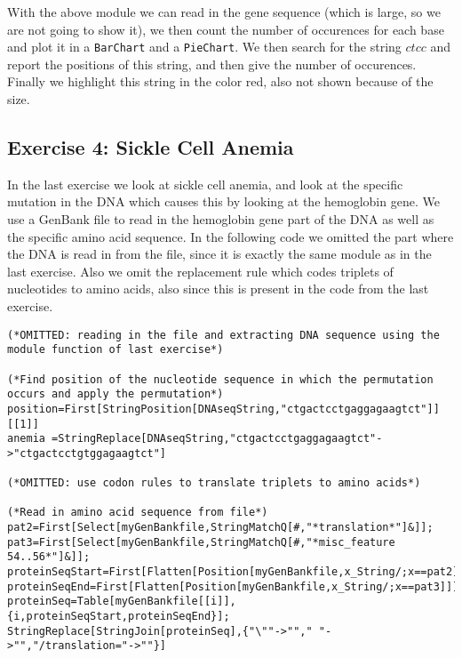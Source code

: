 \documentclass[11pt,a4paper,onecolumn]{article}
\begin{document}
\begin{figure}[H]
  \centering
\end{figure}

With the above module we can read in the gene sequence (which is large, so we are not going to show it), we then count the number of occurences for each base and plot it in a \texttt{BarChart} and a \texttt{PieChart}. We then search for the string $ctcc$ and report the positions of this string, and then give the number of occurences. Finally we highlight this string in the color red, also not shown because of the size.

\subsection{Exercise 4: Sickle Cell Anemia}
In the last exercise we look at sickle cell anemia, and look at the specific mutation in the DNA which causes this by looking at the hemoglobin gene. We use a GenBank file to read in the hemoglobin gene part of the DNA as well as the specific amino acid sequence. In the following code we omitted the part where the DNA is read in from the file, since it is exactly the same module as in the last exercise. Also we omit the replacement rule which codes triplets of nucleotides to amino acids, also since this is present in the code from the last exercise.

\begin{lstlisting}[mathescape]
(*OMITTED: reading in the file and extracting DNA sequence using the module function of last exercise*)

(*Find position of the nucleotide sequence in which the permutation occurs and apply the permutation*)
position=First[StringPosition[DNAseqString,"ctgactcctgaggagaagtct"]][[1]]
anemia =StringReplace[DNAseqString,"ctgactcctgaggagaagtct"->"ctgactcctgtggagaagtct"]

(*OMITTED: use codon rules to translate triplets to amino acids*)

(*Read in amino acid sequence from file*)
pat2=First[Select[myGenBankfile,StringMatchQ[#,"*translation*"]&]];
pat3=First[Select[myGenBankfile,StringMatchQ[#,"*misc_feature    54..56*"]&]];
proteinSeqStart=First[Flatten[Position[myGenBankfile,x_String/;x==pat2]]];
proteinSeqEnd=First[Flatten[Position[myGenBankfile,x_String/;x==pat3]]]-1;
proteinSeq=Table[myGenBankfile[[i]],{i,proteinSeqStart,proteinSeqEnd}];
StringReplace[StringJoin[proteinSeq],{"\""->""," "->"","/translation="->""}]
\end{lstlisting}
\end{document}
